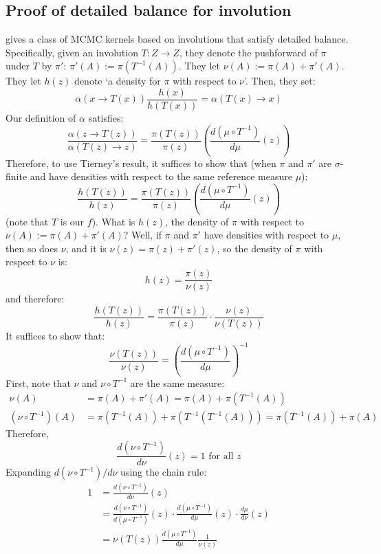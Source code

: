\documentclass[twoside]{article}
\begin{document}
\subsection{Proof of detailed balance for involution}
\citet{tierney1998note} gives a class of MCMC kernels based on involutions that satisfy detailed balance.
Specifically, given an involution $T : Z \to Z$, they denote the pushforward of $\pi$ under $T$ by $\pi'$:
$\pi'(A) := \pi(T^{-1}(A))$.
They let $\nu(A) := \pi(A) + \pi'(A)$.
They let $h(z)$ denote `a density for $\pi$ with respect to $\nu$'.
Then, they set:
\[
\alpha(x \to T(x)) \frac{h(x)}{h(T(x))} = \alpha(T(x) \to x)
\]
Our definition of $\alpha$ satisfies:
\[
\frac{\alpha(z \to T(z))}{\alpha(T(z) \to z)} = \frac{\pi(T(z))}{\pi(z)} \left( \frac{d (\mu \circ T^{-1})}{d \mu} (z) \right)
\]
Therefore, to use Tierney's result, it suffices to show that (when $\pi$ and $\pi'$ are $\sigma$-finite and have densities with respect to the same reference measure $\mu$):
\[
\frac{h(T(z))}{h(z)}= \frac{\pi(T(z))}{\pi(z)} \left( \frac{d (\mu \circ T^{-1})}{d \mu} (z) \right)
\]
(note that $T$ is our $f$).
What is $h(z)$, the density of $\pi$ with respect to $\nu(A) := \pi(A) + \pi'(A)$?
Well, if $\pi$ and $\pi'$ have densities with respect to $\mu$, then so does $\nu$, and it is $\nu(z) = \pi(z) + \pi'(z)$, so the density of $\pi$ with respect to $\nu$ is:
\[
h(z) = \frac{\pi(z)}{\nu(z)} %
\]
and therefore:
\[
\frac{h(T(z))}{h(z)} = \frac{\pi(T(z))}{\pi(z)} \cdot \frac{\nu(z)}{\nu(T(z))}
\]
It suffices to show that:
\[
\frac{\nu(T(z))}{\nu(z)} = \left( \frac{d (\mu \circ T^{-1})}{d \mu} \right)^{-1}
\]
First, note that $\nu$ and $\nu \circ T^{-1}$ are the same measure:
\begin{align}
\nu(A) &= \pi(A) + \pi'(A) = \pi(A) + \pi(T^{-1}(A))\\
(\nu \circ T^{-1})(A) &= \pi(T^{-1}(A)) + \pi(T^{-1}(T^{-1}(A))) = \pi(T^{-1}(A)) + \pi(A)
\end{align}
Therefore,
\[
\frac{d (\nu \circ T^{-1})}{d \nu}(z) = 1 \mbox{ for all } z
\]
Expanding $d(\nu \circ T^{-1}) / d \nu$ using the chain rule:
\begin{align}
1 &= \frac{d (\nu \circ T^{-1})}{d \nu}(z)\\
&=   \frac{d (\nu \circ T^{-1})}{d (\mu \circ T^{-1})}(z) \cdot
    \frac{d (\mu \circ T^{-1})}{d \mu}(z) \cdot
    \frac{d \mu}{d \nu}(z)\\
&= \nu(T(z))  \frac{d (\mu \circ T^{-1})}{d \mu} \frac{1}{\nu(z)}
\end{align}
\end{document}
